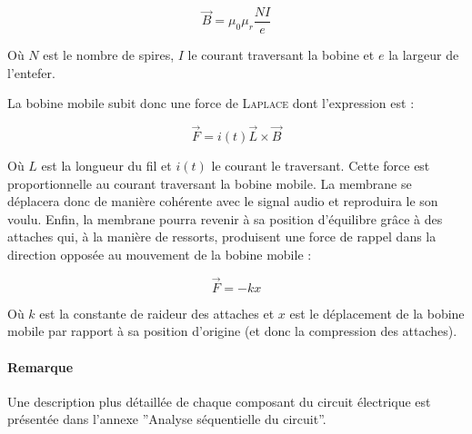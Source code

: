 $$\vec{B} = \mu_0\mu_r\frac{NI}{e}$$

Où $N$ est le nombre de spires, $I$ le courant traversant la bobine et $e$ la largeur de 
l'entefer.

La bobine mobile subit donc une force de \textsc{Laplace} dont l'expression est :

$$\vec{F} = i(t)\vec{L}\times{\vec{B}}$$ 

Où $L$ est la longueur du fil et $i(t)$ le courant le traversant. Cette force est proportionnelle
au courant traversant
la bobine mobile. La membrane se déplacera donc de manière cohérente avec le signal audio
et reproduira le son voulu. Enfin, la membrane pourra revenir à sa position d'équilibre
grâce à des attaches qui, à la manière de ressorts, produisent une force de rappel dans la
direction opposée au mouvement de la bobine mobile :

$$\vec{F} = -kx$$ %

Où $k$ est la constante de raideur des attaches et $x$ est le déplacement de la bobine mobile
par rapport à sa position d'origine (et donc la compression des attaches).

\paragraph{Remarque}
Une description plus détaillée de chaque composant du circuit électrique est présentée
dans l'annexe ''Analyse séquentielle du circuit''.


